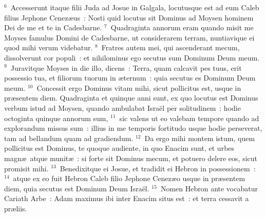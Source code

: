 ${}^{6}$~Accesserunt itaque filii Juda ad Josue in Galgala, locutusque est ad eum Caleb filius Jephone Cenez\ae us~: Nosti quid locutus sit Dominus ad Moysen hominem Dei de me et te in Cadesbarne.
${}^{7}$~Quadraginta annorum eram quando misit me Moyses famulus Domini de Cadesbarne, ut considerarem terram, nuntiavique ei quod mihi verum videbatur.
${}^{8}$~Fratres autem mei, qui ascenderant mecum, dissolverunt cor populi~: et nihilominus ego secutus sum Dominum Deum meum.
${}^{9}$~Juravitque Moyses in die illo, dicens~: Terra, quam calcavit pes tuus, erit possessio tua, et filiorum tuorum in \ae ternum~: quia secutus es Dominum Deum meum.
${}^{10}$~Concessit ergo Dominus vitam mihi, sicut pollicitus est, usque in pr\ae sentem diem. Quadraginta et quinque anni sunt, ex quo locutus est Dominus verbum istud ad Moysen, quando ambulabat Isra\"el per solitudinem~: hodie octoginta quinque annorum sum,
${}^{11}$~sic valens ut eo valebam tempore quando ad explorandum missus sum~: illius in me temporis fortitudo usque hodie perseverat, tam ad bellandum quam ad gradiendum.
${}^{12}$~Da ergo mihi montem istum, quem pollicitus est Dominus, te quoque audiente, in quo Enacim sunt, et urbes magn\ae\ atque munit\ae~: si forte sit Dominus mecum, et potuero delere eos, sicut promisit mihi.
${}^{13}$~Benedixitque ei Josue, et tradidit ei Hebron in possessionem~:
${}^{14}$~atque ex eo fuit Hebron Caleb filio Jephone Cenez\ae o usque in pr\ae sentem diem, quia secutus est Dominum Deum Isra\"el.
${}^{15}$~Nomen Hebron ante vocabatur Cariath Arbe~: Adam maximus ibi inter Enacim situs est~: et terra cessavit a pr\ae liis.

